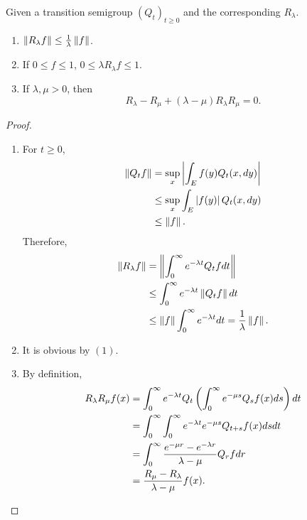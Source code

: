 \begin{prop}
    Given a transition semigroup $(Q_t)_{t \geq 0}$ and the corresponding $R_\lambda$.
    \begin{enumerate}[label=(\arabic{*})]
        \item $\left\lVert R_\lambda f\right\lVert \leq \frac{1}{\lambda} \left\lVert f\right\lVert$.
        \item If $0 \leq f \leq 1$, $0 \leq \lambda R_\lambda f \leq 1$.
        \item If $\lambda,\mu > 0$, then
        \begin{equation*}
            R_\lambda - R_\mu + (\lambda - \mu) R_\lambda R_\mu = 0.
        \end{equation*}
    \end{enumerate}
\end{prop}
\begin{proof}
    \begin{enumerate}[label=(\arabic{*})]
        \item For $t \geq 0$,
        \begin{align*}
            \left\lVert Q_t f\right\lVert &= \sup_x \left\lvert\int_E f(y) Q_t(x,dy)\right\lvert \\
            &\leq \sup_x \int_E \left\lvert f(y)\right\lvert Q_t(x,dy) \\
            &\leq \left\lVert f\right\lVert.
        \end{align*}
        Therefore,
        \begin{align*}
            \left\lVert R_\lambda f\right\lVert &= \left\lVert\int_0^\infty e^{-\lambda t}Q_tf dt\right\lVert \\
            &\leq \int_0^\infty e^{-\lambda t}\left\lVert Q_tf\right\lVert dt \\
            &\leq \left\lVert f\right\lVert \int_0^\infty e^{-\lambda t} dt = \frac{1}{\lambda} \left\lVert f\right\lVert.
        \end{align*}

        \item It is obvious by $(1)$.

        \item By definition,
        \begin{align*}
            R_\lambda R_\mu f(x) &= \int_0^\infty e^{-\lambda t} Q_t\left(\int_0^\infty e^{-\mu s} Q_s f(x) ds\right)dt \\
            &= \int_0^\infty\int_0^\infty e^{-\lambda t}  e^{-\mu s} Q_{t+s} f(x) ds dt \\
            &= \int_0^\infty \frac{e^{-\mu r} - e^{-\lambda r}}{\lambda -\mu}Q_rf  dr\\
            &= \frac{R_\mu - R_\lambda}{\lambda -\mu} f(x). \qedhere
        \end{align*}
    \end{enumerate}
\end{proof}

